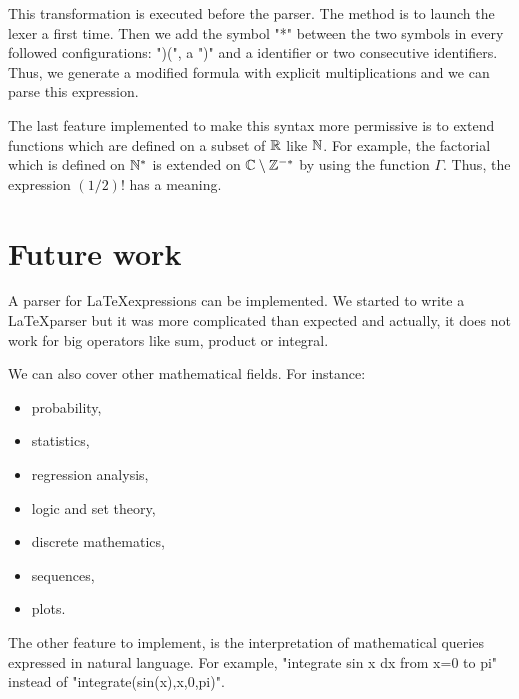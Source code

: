 This transformation is executed before the parser. The method is to launch the lexer a first time. Then we add the symbol "*" between the two symbols in every followed configurations: ")(", a ")" and a identifier or  two consecutive identifiers. Thus, we generate a modified formula with explicit multiplications and we can parse this expression.

The last feature implemented to make this syntax more permissive is to extend functions which are defined on a subset of $\mathbb{R}$ like $\mathbb{N}$. For example, the factorial which is defined on $\mathbb{N}^*$ is extended on $\mathbb{C}\setminus \mathbb{Z}^{-*}$ by using the function $\Gamma$. Thus, the expression $(1/2)!$ has a meaning.


\section{Future work}

A parser for \LaTeX expressions can be implemented. We started to write a \LaTeX parser but it was more complicated than expected and actually, it does not work for big operators like sum, product or integral.

We can also cover other mathematical fields. For instance:
\begin{itemize}
    \item probability,
    \item statistics,
    \item regression analysis,
    \item logic and set theory,
    \item discrete mathematics,
    \item sequences,
    \item plots.
\end{itemize}

The other feature to implement, is the interpretation of mathematical queries expressed in natural language. For example, "integrate sin x dx from x=0 to pi" instead of "integrate(sin(x),x,0,pi)".